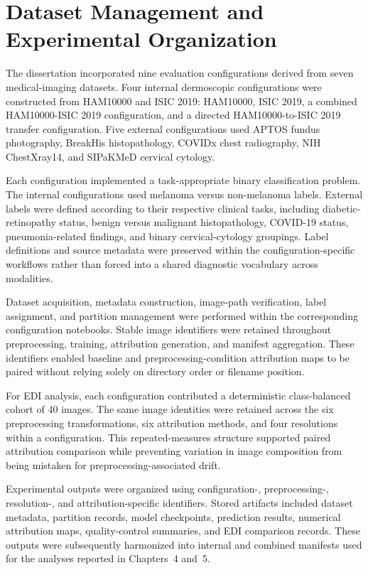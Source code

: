 \section{Dataset Management and Experimental Organization}

The dissertation incorporated nine evaluation configurations derived from seven medical-imaging datasets. Four internal dermoscopic configurations were constructed from HAM10000 and ISIC 2019: HAM10000, ISIC 2019, a combined HAM10000-ISIC 2019 configuration, and a directed HAM10000-to-ISIC 2019 transfer configuration. Five external configurations used APTOS fundus photography, BreakHis histopathology, COVIDx chest radiography, NIH ChestXray14, and SIPaKMeD cervical cytology.

Each configuration implemented a task-appropriate binary classification problem. The internal configurations used melanoma versus non-melanoma labels. External labels were defined according to their respective clinical tasks, including diabetic-retinopathy status, benign versus malignant histopathology, COVID-19 status, pneumonia-related findings, and binary cervical-cytology groupings. Label definitions and source metadata were preserved within the configuration-specific workflows rather than forced into a shared diagnostic vocabulary across modalities.

Dataset acquisition, metadata construction, image-path verification, label assignment, and partition management were performed within the corresponding configuration notebooks. Stable image identifiers were retained throughout preprocessing, training, attribution generation, and manifest aggregation. These identifiers enabled baseline and preprocessing-condition attribution maps to be paired without relying solely on directory order or filename position.

For EDI analysis, each configuration contributed a deterministic class-balanced cohort of 40 images. The same image identities were retained across the six preprocessing transformations, six attribution methods, and four resolutions within a configuration. This repeated-measures structure supported paired attribution comparison while preventing variation in image composition from being mistaken for preprocessing-associated drift.

Experimental outputs were organized using configuration-, preprocessing-, resolution-, and attribution-specific identifiers. Stored artifacts included dataset metadata, partition records, model checkpoints, prediction results, numerical attribution maps, quality-control summaries, and EDI comparison records. These outputs were subsequently harmonized into internal and combined manifests used for the analyses reported in Chapters~4 and~5.


